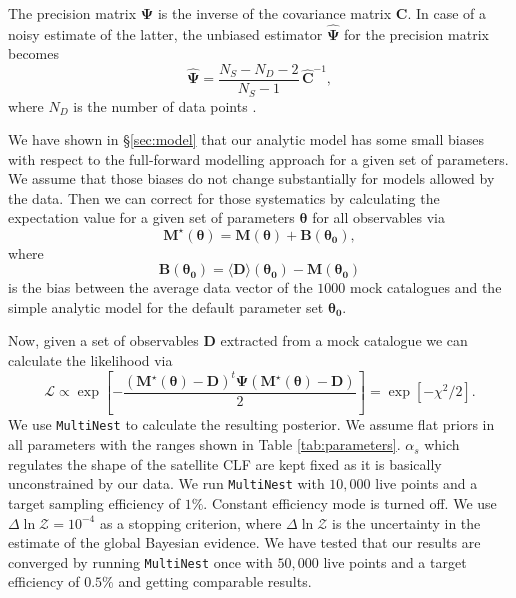 \documentclass[fleqn,usenatbib,useAMS]{mnras}
\begin{document}
	The precision matrix $\boldsymbol{\Psi}$ is the inverse of the covariance matrix $\boldsymbol{C}$. In case of a noisy estimate of the latter, the unbiased estimator $\boldsymbol{\hat{\Psi}}$ for the precision matrix becomes
	\begin{equation}
	\boldsymbol{\hat{\Psi}} = \frac{N_S - N_D - 2}{N_S - 1} \, \boldsymbol{\hat{C}}^{-1},\label{eq:precision}
	\end{equation}
	where $N_D$ is the number of data points \citep{Taylor+13}.
	
	We have shown in \S\ref{sec:model} that our analytic model has some small biases with respect to the full-forward modelling approach for a given set of parameters. We assume that those biases do not change substantially for models allowed by the data. Then we can correct for those systematics by calculating the expectation value for a given set of parameters $\boldsymbol{\theta}$ for all observables via
	\begin{equation}
	\boldsymbol{M}^\star (\boldsymbol{\theta}) = \boldsymbol{M}(\boldsymbol{\theta}) + \boldsymbol{B}(\boldsymbol{\theta_0}),
	\end{equation}
	where
	\begin{equation}
	\boldsymbol{B}(\boldsymbol{\theta_0}) = \langle \boldsymbol{D} \rangle(\boldsymbol{\theta_0}) - \boldsymbol{M}(\boldsymbol{\theta_0})
	\end{equation}
	is the bias between the average data vector of the $1000$ mock catalogues and the simple analytic model for the default parameter set $\boldsymbol{\theta_0}$.
	
	Now, given a set of observables $\boldsymbol{D}$ extracted from a mock catalogue we can calculate the likelihood via
	\begin{equation}
	\mathcal{L} \propto \exp \left[ - \frac{(\boldsymbol{M}^\star (\boldsymbol{\theta}) - \boldsymbol{D})^t \boldsymbol{\Psi} (\boldsymbol{M}^\star (\boldsymbol{\theta}) - \boldsymbol{D})}{2} \right] = \exp\left[ -\chi^2 / 2\right].
	\end{equation}
	We use \texttt{MultiNest} to calculate the resulting posterior. We assume flat priors in all parameters with the ranges shown in Table \ref{tab:parameters}. $\alpha_s$ which regulates the shape of the satellite CLF are kept fixed as it is basically unconstrained by our data. We run \texttt{MultiNest} with $10,000$ live points and a target sampling efficiency of $1\%$. Constant efficiency mode is turned off. We use $\Delta \ln \mathcal{Z} = 10^{-4}$ as a stopping criterion, where $\Delta \ln \mathcal{Z}$ is the uncertainty in the estimate of the global Bayesian evidence. We have tested that our results are converged by running \texttt{MultiNest} once with $50,000$ live points and a target efficiency of $0.5\%$ and getting comparable results. 
	
\end{document}
